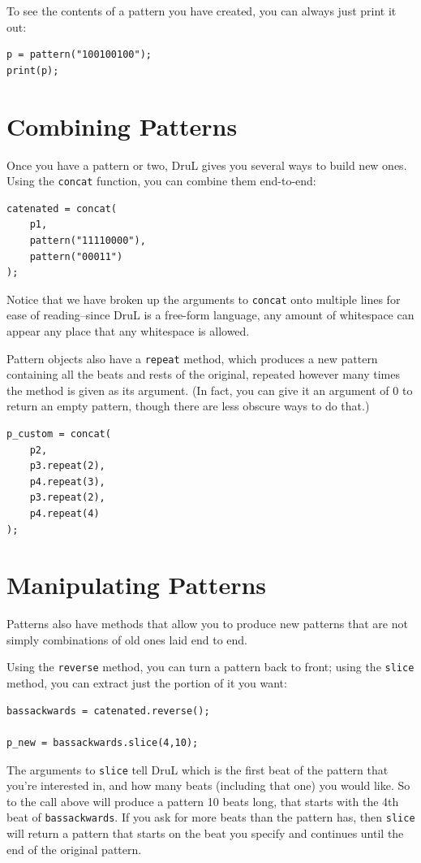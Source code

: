 To see the contents of a pattern you have created, you can always just print it out:

\begin{lstlisting}
p = pattern("100100100");
print(p);
\end{lstlisting}


\section{Combining Patterns}\label{tu:combpat}

Once you have a pattern or two, DruL gives you several ways to build new ones.  Using the {\tt concat} function, you can combine them end-to-end:
\begin{lstlisting}
catenated = concat(
	p1,
	pattern("11110000"),
	pattern("00011")
);
\end{lstlisting}
Notice that we have broken up the arguments to {\tt concat} onto multiple lines for ease of reading--since DruL is a free-form language, any amount of whitespace can appear any place that any whitespace is allowed.

Pattern objects also have a {\tt repeat} method, which produces a new pattern containing all the beats and rests of the original, repeated however many times the method is given as its argument.  (In fact, you can give it an argument of 0 to return an empty pattern, though there are less obscure ways to do that.)

\begin{lstlisting}
p_custom = concat(
	p2,
	p3.repeat(2),
	p4.repeat(3),
	p3.repeat(2),
	p4.repeat(4)
);
\end{lstlisting}
\section{Manipulating Patterns}\label{tu:manippat}

Patterns also have methods that allow you to produce new patterns that are not simply combinations of old ones laid end to end.

Using the {\tt reverse} method, you can turn a pattern back to front; using the {\tt slice} method, you can extract just the portion of it you want:

\begin{lstlisting}
bassackwards = catenated.reverse();

p_new = bassackwards.slice(4,10);
\end{lstlisting}

The arguments to {\tt slice} tell DruL which is the first beat of the pattern that you're interested in, and how many beats (including that one) you would like.  So to the call above will produce a pattern 10 beats long, that starts with the 4th beat of {\tt bassackwards}.  If you ask for more beats than the pattern has, then {\tt slice} will return a pattern that starts on the beat you specify and continues until the end of the original pattern.


